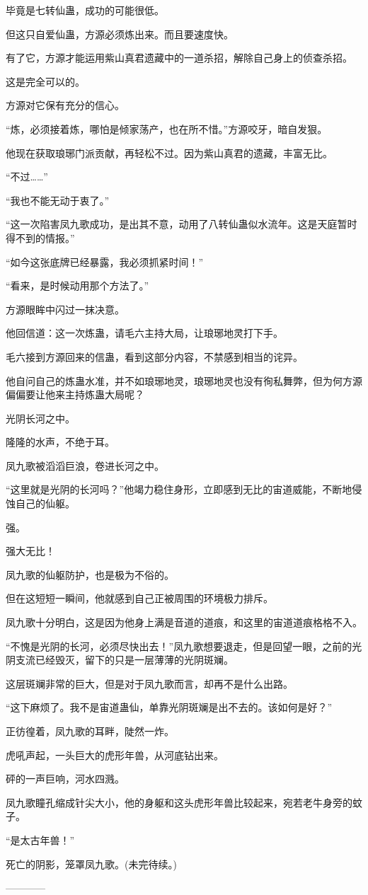 \begin{this_body}
毕竟是七转仙蛊，成功的可能很低。

但这只自爱仙蛊，方源必须炼出来。而且要速度快。

有了它，方源才能运用紫山真君遗藏中的一道杀招，解除自己身上的侦查杀招。

这是完全可以的。

方源对它保有充分的信心。

“炼，必须接着炼，哪怕是倾家荡产，也在所不惜。”方源咬牙，暗自发狠。

他现在获取琅琊门派贡献，再轻松不过。因为紫山真君的遗藏，丰富无比。

“不过……”

“我也不能无动于衷了。”

“这一次陷害凤九歌成功，是出其不意，动用了八转仙蛊似水流年。这是天庭暂时得不到的情报。”

“如今这张底牌已经暴露，我必须抓紧时间！”

“看来，是时候动用那个方法了。”

方源眼眸中闪过一抹决意。

他回信道：这一次炼蛊，请毛六主持大局，让琅琊地灵打下手。

毛六接到方源回来的信蛊，看到这部分内容，不禁感到相当的诧异。

他自问自己的炼蛊水准，并不如琅琊地灵，琅琊地灵也没有徇私舞弊，但为何方源偏偏要让他来主持炼蛊大局呢？

光阴长河之中。

隆隆的水声，不绝于耳。

凤九歌被滔滔巨浪，卷进长河之中。

“这里就是光阴的长河吗？”他竭力稳住身形，立即感到无比的宙道威能，不断地侵蚀自己的仙躯。

强。

强大无比！

凤九歌的仙躯防护，也是极为不俗的。

但在这短短一瞬间，他就感到自己正被周围的环境极力排斥。

凤九歌十分明白，这是因为他身上满是音道的道痕，和这里的宙道道痕格格不入。

“不愧是光阴的长河，必须尽快出去！”凤九歌想要退走，但是回望一眼，之前的光阴支流已经毁灭，留下的只是一层薄薄的光阴斑斓。

这层斑斓非常的巨大，但是对于凤九歌而言，却再不是什么出路。

“这下麻烦了。我不是宙道蛊仙，单靠光阴斑斓是出不去的。该如何是好？”

正彷徨着，凤九歌的耳畔，陡然一炸。

虎吼声起，一头巨大的虎形年兽，从河底钻出来。

砰的一声巨响，河水四溅。

凤九歌瞳孔缩成针尖大小，他的身躯和这头虎形年兽比较起来，宛若老牛身旁的蚊子。

“是太古年兽！”

死亡的阴影，笼罩凤九歌。(未完待续。)

------------

\end{this_body}

